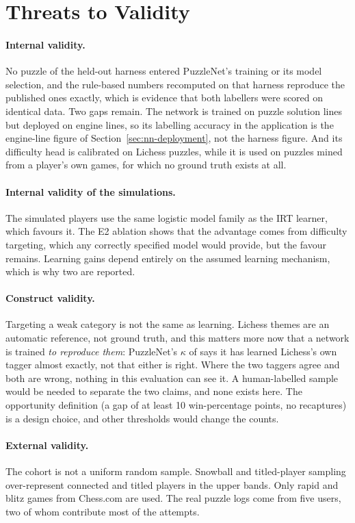 \section{Threats to Validity}\label{sec:validity}

\paragraph{Internal validity.} No puzzle of the held-out harness entered PuzzleNet's training or its
model selection, and the rule-based numbers recomputed on that harness reproduce the published ones
exactly, which is evidence that both labellers were scored on identical data. Two gaps remain. The
network is trained on puzzle solution lines but deployed on engine lines, so its labelling accuracy in
the application is the engine-line figure of Section~\ref{sec:nn-deployment}, not the harness figure.
And its difficulty head is calibrated on Lichess puzzles, while it is used on puzzles mined from a
player's own games, for which no ground truth exists at all.

\paragraph{Internal validity of the simulations.} The simulated players use the same logistic model family as the IRT
learner, which favours it. The E2 ablation shows that the advantage comes from difficulty targeting,
which any correctly specified model would provide, but the favour remains. Learning gains depend
entirely on the assumed learning mechanism, which is why two are reported.

\paragraph{Construct validity.} Targeting a weak category is not the same as learning. Lichess themes
are an automatic reference, not ground truth, and this matters more now that a network is trained
\emph{to reproduce them}: PuzzleNet's $\kappa$ of \KAPPANN{} says it has learned Lichess's own tagger
almost exactly, not that either is right. Where the two taggers agree and both are wrong, nothing in
this evaluation can see it. A human-labelled sample would be needed to separate the two claims, and
none exists here. The opportunity definition (a gap of at least 10
win-percentage points, no recaptures) is a design choice, and other thresholds would change the
counts.

\paragraph{External validity.} The cohort is not a uniform random sample. Snowball and titled-player
sampling over-represent connected and titled players in the upper bands. Only rapid and blitz games
from Chess.com are used. The real puzzle logs come from five users, two of whom contribute most of the
attempts.

